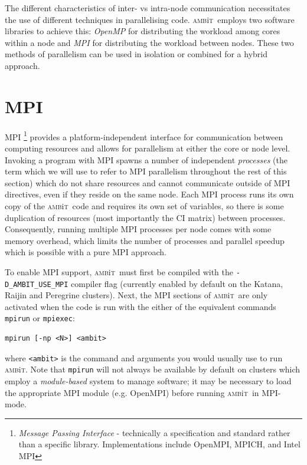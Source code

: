 \documentclass{report}
\newcommand{\ambit}{\textsc{amb}{\footnotesize i}\textsc{t}}
\begin{document}
The different characteristics of inter- vs intra-node communication necessitates the use of different
techniques in parallelising code. \ambit ~employs two software libraries to achieve this: \textit{OpenMP} 
for distributing the workload among cores within a node and \textit{MPI} for distributing the workload
between nodes. These two methods of parallelism can be used in isolation or combined for a hybrid
approach. 

\section{MPI}
\label{sec:MPI}

MPI \footnote{\textit{Message Passing Interface} - technically a specification and standard rather than a
specific library. Implementations include OpenMPI, MPICH, and Intel MPI} provides a platform-independent
interface for communication between computing resources and allows for parallelism at either the core or
node level. Invoking a program with MPI spawns a number of independent \textit{processes} (the term which
we will use to refer to MPI parallelism throughout the rest of this section) which do not share resources
and cannot communicate outside of MPI directives, even if they reside on the same node. Each MPI process
runs its own copy of the \ambit ~code and requires its own set of variables, so there is some duplication
of resources (most importantly the CI matrix) between processes. Consequently, running multiple MPI
processes per node comes with some memory overhead, which limits the number of processes and parallel
speedup which is possible with a pure MPI approach.

To enable MPI support, \ambit ~must first be compiled with the \texttt{-D\_AMBIT\_USE\_MPI} compiler flag
(currently enabled by default on the Katana, Raijin and Peregrine clusters). Next, the MPI sections of
\ambit ~are only activated when the code is run with the either of the equivalent commands 
\texttt{mpirun} or \texttt{mpiexec}:

\begin{verbatim}
mpirun [-np <N>] <ambit>
\end{verbatim}

where \texttt{<ambit>} is the command and arguments you would usually use to run \ambit. Note that
\texttt{mpirun} will not always be available by default on clusters which employ a \textit{module-based}
system to manage software; it may be necessary to load the appropriate MPI module (e.g. OpenMPI) before
running \ambit ~in MPI-mode.
\end{document}
